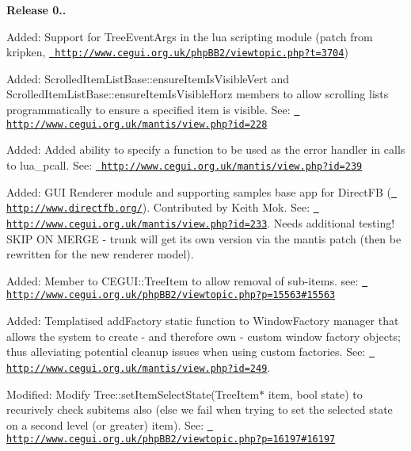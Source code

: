 {\bfseries{Release 0..}}
\begin{DoxyItemize}
\item Added\+: Support for Tree\+Event\+Args in the lua scripting module (patch from kripken, \href{http://www.cegui.org.uk/phpBB2/viewtopic.php?t=3704}{\texttt{ http\+://www.\+cegui.\+org.\+uk/php\+B\+B2/viewtopic.\+php?t=3704}})
\item Added\+: Scrolled\+Item\+List\+Base\+::ensure\+Item\+Is\+Visible\+Vert and Scrolled\+Item\+List\+Base\+::ensure\+Item\+Is\+Visible\+Horz members to allow scrolling lists programmatically to ensure a specified item is visible. See\+: \href{http://www.cegui.org.uk/mantis/view.php?id=228}{\texttt{ http\+://www.\+cegui.\+org.\+uk/mantis/view.\+php?id=228}}
\item Added\+: Added ability to specify a function to be used as the error handler in calls to lua\+\_\+pcall. See\+: \href{http://www.cegui.org.uk/mantis/view.php?id=239}{\texttt{ http\+://www.\+cegui.\+org.\+uk/mantis/view.\+php?id=239}}
\item Added\+: G\+UI Renderer module and supporting samples base app for Direct\+FB (\href{http://www.directfb.org/}{\texttt{ http\+://www.\+directfb.\+org/}}). Contributed by Keith Mok. See\+: \href{http://www.cegui.org.uk/mantis/view.php?id=233}{\texttt{ http\+://www.\+cegui.\+org.\+uk/mantis/view.\+php?id=233}}. Needs additional testing! S\+K\+IP ON M\+E\+R\+GE -\/ trunk will get it\textquotesingle{}s own version via the mantis patch (then be rewritten for the new renderer model).
\item Added\+: Member to C\+E\+G\+U\+I\+::\+Tree\+Item to allow removal of sub-\/items. see\+: \href{http://www.cegui.org.uk/phpBB2/viewtopic.php?p=15563\#15563}{\texttt{ http\+://www.\+cegui.\+org.\+uk/php\+B\+B2/viewtopic.\+php?p=15563\#15563}}
\item Added\+: Templatised add\+Factory static function to Window\+Factory manager that allows the system to create -\/ and therefore own -\/ custom window factory objects; thus alleviating potential cleanup issues when using custom factories. See\+: \href{http://www.cegui.org.uk/mantis/view.php?id=249}{\texttt{ http\+://www.\+cegui.\+org.\+uk/mantis/view.\+php?id=249}}.
\item Modified\+: Modify Tree\+::set\+Item\+Select\+State(\+Tree\+Item$\ast$ item, bool state) to recurively check subitems also (else we fail when trying to set the selected state on a second level (or greater) item). See\+: \href{http://www.cegui.org.uk/phpBB2/viewtopic.php?p=16197\#16197}{\texttt{ http\+://www.\+cegui.\+org.\+uk/php\+B\+B2/viewtopic.\+php?p=16197\#16197}}

\end{DoxyItemize}
